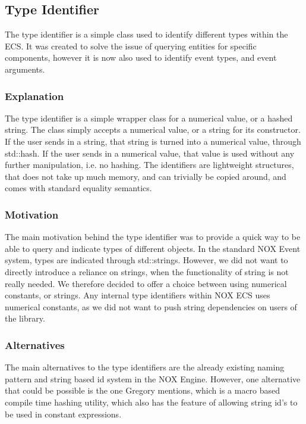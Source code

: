 \subsection{Type Identifier}
\label{subsec:detailed_type_identifier}

The type identifier is a simple class used to identify different types within
the ECS.
It was created to solve the issue of querying entities for specific components,
however it is now also used to identify event types, and event arguments.

\subsubsection{Explanation}
The type identifier is a simple wrapper class for a numerical value,
or a hashed string.
The class simply accepts a numerical value, or a string for its constructor.
If the user sends in a string, that string is turned into a numerical value,
through std::hash. If the user sends in a numerical value,
that value is used without any further manipulation, i.e. no hashing.
The identifiers are lightweight structures, that does not take up much memory,
and can trivially be copied around, and comes with standard equality semantics.

\subsubsection{Motivation}
The main motivation behind the type identifier was to provide a quick
way to be able to query and indicate types of different objects.
In the standard NOX Event system, types are indicated through std::strings.
However, we did not want to directly introduce a reliance on strings, when
the functionality of string is not really needed.
We therefore decided to offer a choice between using numerical constants, or strings.
Any internal type identifiers within NOX ECS uses numerical constants,
as we did not want to push string dependencies on users of the library.

\subsubsection{Alternatives}
The main alternatives to the type identifiers are the already existing
naming pattern and string based id system in the NOX Engine.
However, one alternative that could be possible is the one Gregory\cite[p. 276]{game_engine_architecture}
mentions, which is a macro based compile time hashing utility,
which also has the feature of allowing string id's to be used in constant expressions.

